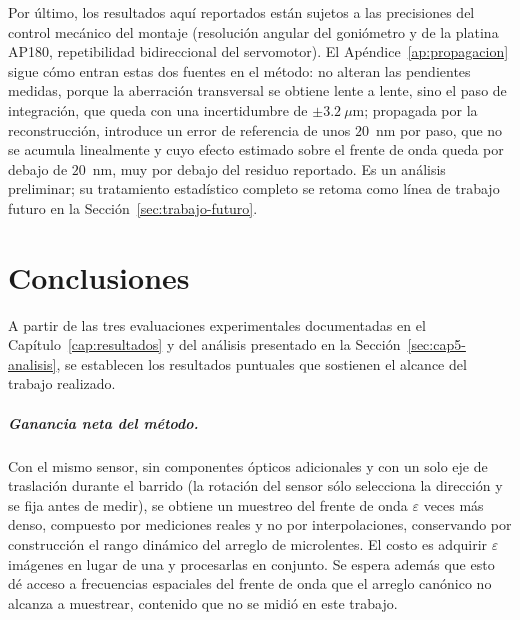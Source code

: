 \documentclass[letterpaper,12pt,oneside]{book}
\begin{document}
Por último, los resultados aquí reportados están sujetos a las precisiones del control
mecánico del montaje (resolución angular del goniómetro y de la platina AP180,
repetibilidad bidireccional del servomotor). El Apéndice~\ref{ap:propagacion} sigue cómo
entran estas dos fuentes en el método: no alteran las pendientes medidas, porque la
aberración transversal se obtiene lente a lente, sino el paso de integración, que queda
con una incertidumbre de $\pm 3.2~\mu$m; propagada por la reconstrucción, introduce un
error de referencia de unos $20$~nm por paso, que no se acumula linealmente y cuyo efecto
estimado sobre el frente de onda queda por debajo de $20$~nm, muy por debajo del residuo
reportado. Es un análisis preliminar; su tratamiento estadístico completo se retoma
como línea de trabajo futuro en la Sección~\ref{sec:trabajo-futuro}.


\chapter{Conclusiones}\label{cap:conclusiones}

A partir de las tres evaluaciones experimentales documentadas en el
Capítulo~\ref{cap:resultados} y del análisis presentado en la
Sección~\ref{sec:cap5-analisis}, se establecen los resultados puntuales que sostienen el
alcance del trabajo realizado.

\paragraph{Ganancia neta del método.} Con el mismo sensor, sin componentes ópticos
adicionales y con un solo eje de traslación durante el barrido (la rotación del sensor
sólo selecciona la dirección y se fija antes de medir), se obtiene un muestreo del frente
de onda $\varepsilon$ veces más denso, compuesto por mediciones reales y no por
interpolaciones, conservando por construcción el rango dinámico del arreglo de
microlentes. El costo es adquirir $\varepsilon$ imágenes en lugar de una y procesarlas en
conjunto. Se espera además que esto dé acceso a frecuencias espaciales del frente de onda
que el arreglo canónico no alcanza a muestrear, contenido que no se midió en este trabajo.
\end{document}
